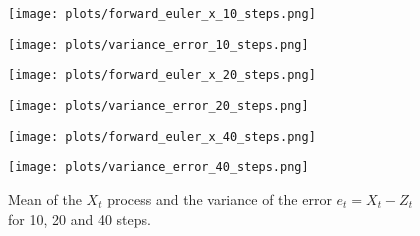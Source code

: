 \documentclass[a4paper,12pt]{article} %
\begin{document}
\begin{figure}[H]
    \centering
    \begin{minipage}{0.45\textwidth}
        \centering
        \texttt{[image: plots/forward\_euler\_x\_10\_steps.png]}
    \end{minipage}
    \hfill
    \begin{minipage}{0.45\textwidth}
        \centering
        \texttt{[image: plots/variance\_error\_10\_steps.png]}
    \end{minipage}

    \vspace{0.5cm}
    \begin{minipage}{0.45\textwidth}
        \centering
        \texttt{[image: plots/forward\_euler\_x\_20\_steps.png]}
    \end{minipage}
    \hfill
    \begin{minipage}{0.45\textwidth}
        \centering
        \texttt{[image: plots/variance\_error\_20\_steps.png]}
    \end{minipage}

    \vspace{0.5cm}
    \begin{minipage}{0.45\textwidth}
        \centering
        \texttt{[image: plots/forward\_euler\_x\_40\_steps.png]}
    \end{minipage}
    \hfill
    \begin{minipage}{0.45\textwidth}
        \centering
        \texttt{[image: plots/variance\_error\_40\_steps.png]}
    \end{minipage}



    \caption{Mean of the \(X_t\) process and the variance of the error \(e_t =X_t -Z_t\)  for 10, 20 and 40 steps.}
\end{figure}
\end{document}
